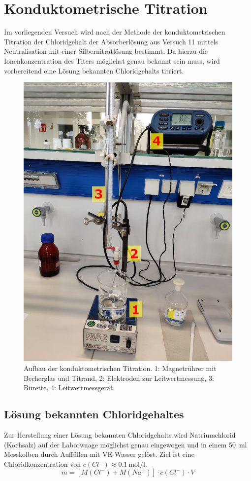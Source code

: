 	\section{Konduktometrische Titration}\label{sec:titration}
		Im vorliegenden Versuch wird nach der Methode der konduktometrischen Titration der Chloridgehalt der Absorberlösung aus Versuch 11 mittels Neutralisation mit
		einer Silbernitratlösung bestimmt. Da hierzu die Ionenkonzentration des Titers möglichst genau bekannt sein muss, wird vorbereitend eine Lösung bekannten Chloridgehalts
		titriert. \nocite{Analytische.Chemie.I.Ritgen.2019}
		\begin{figure}[h]
			\centering
			\includegraphics[width=.7\textwidth]{assets/photos/aufbau1_edit.jpg}
			\caption[aufbau Titration]{Aufbau der konduktometrischen Titration. 1: Magnetrührer mit Becherglas und Titrand, 2: Elektroden zur Leitwertmessung, 3: Bürette, 4: Leitwertmessgerät.}
			\label{fig:aufbau titration}
		\end{figure}
		\subsection{Lösung bekannten Chloridgehaltes}\label{sec:bekannter chloridgehalt}
			Zur Herstellung einer Lösung bekannten Chloridgehalts wird Natriumchlorid (Kochsalz) auf der Laborwaage möglichst genau eingewogen
			und in einem \SI{50}{\milli\litre} Messkolben durch Auffüllen mit VE-Wasser gelöst. Ziel ist eine Chloridkonzentration von \(c(Cl^{-}) \approx \SI{0,1}{\mole\per\litre}\).
			\begin{equation}
				m = \left[M(Cl^{-}) + M(Na^{+})\right] \cdot c(Cl^{-}) \cdot V
				\label{eq:masse NaCl}
			\end{equation}

